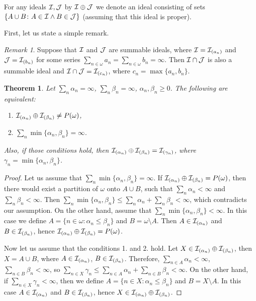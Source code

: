 \documentclass[12pt]{article}
\theoremstyle{plain}
\newtheorem{theorem}{Theorem}[section]
\theoremstyle{definition}
\theoremstyle{remark}
\newtheorem*{remark}{Remark}
\newcommand{\cI}{{\cal I}}
\newcommand{\cJ}{{\cal J}}
\begin{document}
For any ideals $\cI, \cJ$ by $\cI \oplus \cJ$ we denote
an ideal consisting of sets $\{A \cup B\colon A \in \cI \wedge B \in \cJ\}$ 
(assuming that this ideal is proper).

First, let us state a simple remark.
\begin{remark}
Suppose that $\cI$ and $\cJ$ are summable ideals, where
$\cI = \cI_{(a_n)}$ and $\cJ = \cI_{(b_n)}$ for some
series $\sum_{n\in\omega} a_n = \sum_{n\in\omega} b_n = \infty$.
Then $\cI \cap \cJ$ is also a summable ideal and
$\cI \cap \cJ = \cI_{(c_n)}$, where $c_n= \max\{a_n, b_n\}$.
\end{remark}

\begin{theorem}
Let $\sum_n \alpha_n = \infty$, $\sum_n \beta_n = \infty$,
$\alpha_n, \beta_n \geq 0$. The following are equivalent:
\begin{enumerate}
\item
  $\cI_{(\alpha_n)} \oplus \cI_{(\beta_n)} \not = P(\omega)$,
\item
  $\sum_n \min\{\alpha_n,\beta_n\} = \infty$.
\end{enumerate}
Also, if those conditions hold, then $\cI_{(\alpha_n)} \oplus \cI_{(\beta_n)} = \cI_{(\gamma_n)}$,
where $\gamma_n = \min\{\alpha_n,\beta_n\}$.
\end{theorem}
\begin{proof}
Let us assume that $\sum_n \min\{\alpha_n,\beta_n\} = \infty$. If 
$\cI_{(\alpha_n)} \oplus \cI_{(\beta_n)} = P(\omega)$, then there would exist a partition of $\omega$ onto $A \cup B$, such that 
$\sum_n \alpha_n < \infty$ and $\sum_n \beta_n < \infty$.
Then $\sum_n \min\{\alpha_n,\beta_n\} \leq \sum_n \alpha_n + \sum_n \beta_n < \infty$,
which contradicts our assumption.
On the other hand, assume that $\sum_n \min\{\alpha_n,\beta_n\} < \infty$. In this case we define $A = \{n \in \omega \colon \alpha_n \leq \beta_n\}$
and $B = \omega \setminus A$. Then 
$A \in \cI_{(\alpha_n)}$ and $B \in \cI_{(\beta_n)}$, hence 
$\cI_{(\alpha_n)} \oplus \cI_{(\beta_n)} = P(\omega)$.
  
Now let us assume that the conditions 1. and 2. hold. Let $X \in \cI_{(\alpha_n)} \oplus \cI_{(\beta_n)}$, then
$X = A \cup B$, where $A \in \cI_{(\alpha_n)}$,
$B \in \cI_{(\beta_n)}$. Therefore, $\sum_{n\in A} \alpha_n < \infty$, 
$\sum_{n\in B} \beta_n < \infty$, so 
$\sum_{n\in X} \gamma_n \leq \sum_{n\in A} \alpha_n + \sum_{n\in B} \beta_n < \infty$.
On the other hand, if $\sum_{n\in X} \gamma_n < \infty$, then we define $A = \{n\in X\colon \alpha_n \leq \beta_n \}$ and 
$B = X \setminus A$. In this case $A \in \cI_{(\alpha_n)}$ and
$B \in \cI_{(\beta_n)}$, hence
$X\in\cI_{(\alpha_n)} \oplus \cI_{(\beta_n)}$.
\end{proof}
\end{document}
